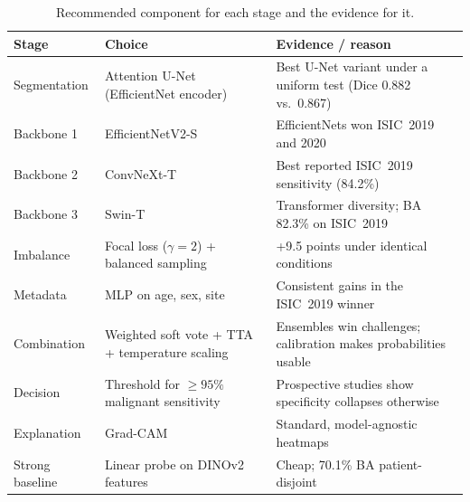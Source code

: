 \documentclass[10pt,a4paper]{article}
\begin{document}
\begin{table}[H]
\centering
\caption{Recommended component for each stage and the evidence for it.}
\renewcommand{\arraystretch}{1.25}
\small
\begin{tabularx}{\linewidth}{@{}L{2.6cm} L{3.8cm} Y@{}}
\toprule
\textbf{Stage} & \textbf{Choice} & \textbf{Evidence / reason} \\
\midrule
Segmentation & Attention U-Net (EfficientNet encoder) & Best U-Net variant under a uniform test (Dice 0.882 vs.\ 0.867)~\cite{azad2024unet} \\
Backbone 1 & EfficientNetV2-S & EfficientNets won ISIC~2019 and 2020~\cite{gessert2020,ha2020siim} \\
Backbone 2 & ConvNeXt-T & Best reported ISIC~2019 sensitivity (84.2\%)~\cite{baykal2024convnext} \\
Backbone 3 & Swin-T & Transformer diversity; BA 82.3\% on ISIC~2019~\cite{ayas2023swin} \\
Imbalance & Focal loss ($\gamma=2$) + balanced sampling & +9.5 points under identical conditions~\cite{nie2023hybrid} \\
Metadata & MLP on age, sex, site & Consistent gains in the ISIC~2019 winner~\cite{gessert2020} \\
Combination & Weighted soft vote + TTA + temperature scaling & Ensembles win challenges; calibration makes probabilities usable \\
Decision & Threshold for $\geq95\%$ malignant sensitivity & Prospective studies show specificity collapses otherwise~\cite{marchetti2023} \\
Explanation & Grad-CAM & Standard, model-agnostic heatmaps~\cite{selvaraju2017gradcam} \\
Strong baseline & Linear probe on DINOv2 features & Cheap; 70.1\% BA patient-disjoint~\cite{yan2025panderm} \\
\bottomrule
\end{tabularx}
\end{table}
\end{document}
